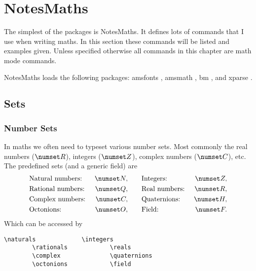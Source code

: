 \documentclass[fleqn, a4paper, openany]{memoir}
\newcommand{\package}[1]{{\textsf{\footnotesize #1}}}  %
\begin{document}
    \chapter{NotesMaths}
    The simplest of the packages is \package{NotesMaths}.
    It defines lots of commands that I use when writing maths.
    In this section these commands will be listed and examples given.
    Unless specified otherwise all commands in this chapter are math mode commands.

    \package{NotesMaths} loads the following packages: \package{amsfonts} \cite{amsfonts}, \package{amsmath} \cite{amsmath}, \package{bm} \cite{bm}, and \package{xparse} \cite{xparse}.
    
    
    \section{Sets}
    \subsection{Number Sets}
    In maths we often need to typeset various number sets.
    Most commonly the real numbers (\(\reals\)), integers (\(\integers\)), complex numbers (\(\complex\)), etc.
    The predefined sets (and a generic field) are
    \begin{align}
        &\text{Natural numbers:}~&\naturals,\qquad &\text{Integers:}~&\integers,\\
        &\text{Rational numbers:}~&\rationals,\qquad &\text{Real numbers:}~&\reals,\\
        &\text{Complex numbers:}~&\complex,\qquad &\text{Quaternions:}~&\quaternions,\\
        &\text{Octonions:}~&\octonions,\qquad &\text{Field:}~&\field.
    \end{align}
    Which can be accessed by
    \begin{Verbatim}[gobble=2]
        \naturals             \integers
        \rationals            \reals
        \complex              \quaternions
        \octonions            \field
    \end{Verbatim}
\end{document}
